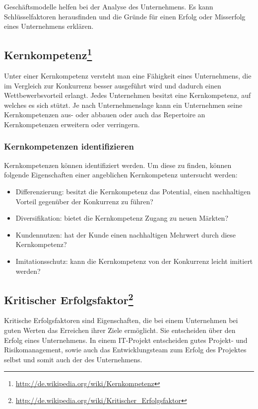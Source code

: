 Geschäftsmodelle helfen bei der Analyse des Unternehmens. Es kann Schlüsselfaktoren herausfinden und die Gründe für einen Erfolg oder Misserfolg eines Unternehmens erklären.


\subsection[Kernkompetenz]{Kernkompetenz\footnote{\url{ http://de.wikipedia.org/wiki/Kernkompetenz}}}

Unter einer Kernkompetenz versteht man eine Fähigkeit eines Unternehmens, die im Vergleich zur Konkurrenz besser ausgeführt wird und dadurch einen Wettbewerbsvorteil erlangt. Jedes Unternehmen besitzt eine Kernkompetenz, auf welches es sich stützt. Je nach Unternehmenslage kann ein Unternehmen seine Kernkompetenzen aus- oder abbauen oder auch das Repertoire an Kernkompetenzen erweitern oder verringern.
\subsubsection{Kernkompetenzen identifizieren}
Kernkompetenzen können identifiziert werden. Um diese zu finden, können folgende Eigenschaften einer angeblichen Kernkompetenz untersucht werden:
\begin{itemize}
\item Differenzierung: besitzt die Kernkompetenz das Potential, einen nachhaltigen Vorteil gegenüber der Konkurrenz zu führen?
\item Diversifikation: bietet die Kernkompetenz Zugang zu neuen Märkten?
\item Kundennutzen: hat der Kunde einen nachhaltigen Mehrwert durch diese Kernkompetenz?
\item Imitationsschutz: kann die Kernkompetenz von der Konkurrenz leicht imitiert werden?
\end{itemize}




\subsection[Kritischer Erfolgsfaktor]{Kritischer Erfolgsfaktor\footnote{\url{ http://de.wikipedia.org/wiki/Kritischer_Erfolgsfaktor}}}

Kritische Erfolgsfaktoren sind Eigenschaften, die bei einem Unternehmen bei guten Werten das Erreichen ihrer Ziele ermöglicht. Sie entscheiden über den Erfolg eines Unternehmens. In einem IT-Projekt entscheiden gutes Projekt- und Risikomanagement, sowie auch das Entwicklungsteam zum Erfolg des Projektes selbst und somit auch der des Unternehmens.



